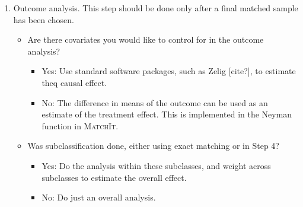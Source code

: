 \documentclass[11pt,titlepage]{article}
\newcommand{\MatchIt}{\textsc{MatchIt}}
\begin{document}
\begin{enumerate}
\item Outcome analysis.  This step should be done only after a final
  matched sample has been chosen.
  \begin{itemize} 
  \item Are there covariates you would like to control for in the
    outcome analysis?
    \begin{itemize} 
    \item Yes: Use standard software packages, such as Zelig [cite?],
      to estimate theq causal effect.
    \item No: The difference in means of the outcome can be used as an
      estimate of the treatment effect.  This is implemented in the
      Neyman function in \MatchIt.
    \end{itemize}
  \item Was subclassification done, either using exact matching or in
    Step 4?
    \begin{itemize} 
    \item Yes: Do the analysis within these subclasses, and weight
      across subclasses to estimate the overall effect.
    \item No: Do just an overall analysis.
    \end{itemize}    
  \end{itemize}
\end{enumerate}  

 
\end{document}
